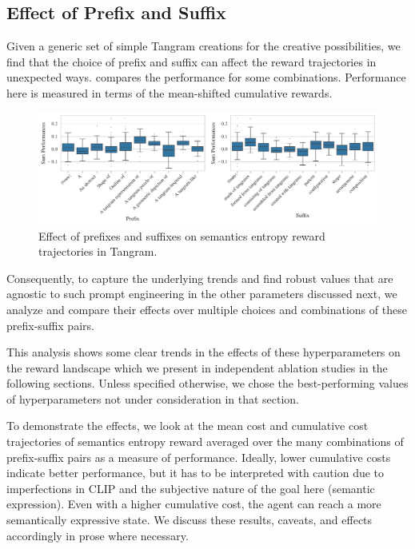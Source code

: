 \subsection{Effect of Prefix and Suffix}
\label{sec:prefix-suffix}

Given a generic set of simple Tangram creations for the creative possibilities, we find that the choice of prefix and suffix can affect the reward trajectories in unexpected ways.  compares the performance for some combinations.
Performance here is measured in terms of the mean-shifted cumulative rewards.

\begin{figure}[h]
    \centering
    \includegraphics[width=\textwidth]{images/prefix-suffix.pdf}
    \caption{Effect of prefixes and suffixes on semantics entropy reward trajectories in Tangram.}
    \label{fig:prefix-suffix}
\end{figure}
\vspace{-7pt}

Consequently, to capture the underlying trends and find robust values that are agnostic to such prompt engineering in the other parameters discussed next, we analyze and compare their effects over multiple choices and combinations of these prefix-suffix pairs.

This analysis shows some clear trends in the effects of these hyperparameters on the reward landscape which we present in independent ablation studies in the following sections.
Unless specified otherwise, we chose the best-performing values of hyperparameters not under consideration in that section.

To demonstrate the effects, we look at the mean cost and cumulative cost trajectories of semantics entropy reward averaged over the many combinations of prefix-suffix pairs as a measure of performance.
Ideally, lower cumulative costs indicate better performance, but it has to be interpreted with caution due to imperfections in CLIP and the subjective nature of the goal here (semantic expression).
Even with a higher cumulative cost, the agent can reach a more semantically expressive state.
We discuss these results, caveats, and effects accordingly in prose where necessary.

